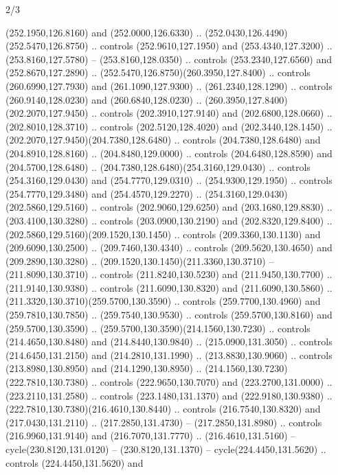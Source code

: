 \begin{flagdescription}{2/3}
\begin{scope}[xshift=0.5\flaglength,yshift=0.5\flagwidth,scale=\flagwidth/259.2]
\begin{scope}[y=0.8pt, x=0.8pt, yscale=-1,shift={(-243,-162)}]
      (252.1950,126.8160) and (252.0000,126.6330) ..
      (252.0430,126.4490)(252.5470,126.8750) .. controls (252.9610,127.1950) and
      (253.4340,127.3200) .. (253.8160,127.5780) -- (253.8160,128.0350) .. controls
      (253.2340,127.6560) and (252.8670,127.2890) ..
      (252.5470,126.8750)(260.3950,127.8400) .. controls (260.6990,127.7930) and
      (261.1090,127.9300) .. (261.2340,128.1290) .. controls (260.9140,128.0230) and
      (260.6840,128.0230) .. (260.3950,127.8400)(202.2070,127.9450) .. controls
      (202.3910,127.9140) and (202.6800,128.0660) .. (202.8010,128.3710) .. controls
      (202.5120,128.4020) and (202.3440,128.1450) ..
      (202.2070,127.9450)(204.7380,128.6480) .. controls (204.7380,128.6480) and
      (204.8910,128.8160) .. (204.8480,129.0000) .. controls (204.6480,128.8590) and
      (204.5700,128.6480) .. (204.7380,128.6480)(254.3160,129.0430) .. controls
      (254.3160,129.0430) and (254.7770,129.0310) .. (254.9300,129.1950) .. controls
      (254.7770,129.3480) and (254.4570,129.2270) ..
      (254.3160,129.0430)(202.5860,129.5160) .. controls (202.9060,129.6250) and
      (203.1680,129.8830) .. (203.4100,130.3280) .. controls (203.0900,130.2190) and
      (202.8320,129.8400) .. (202.5860,129.5160)(209.1520,130.1450) .. controls
      (209.3360,130.1130) and (209.6090,130.2500) .. (209.7460,130.4340) .. controls
      (209.5620,130.4650) and (209.2890,130.3280) ..
      (209.1520,130.1450)(211.3360,130.3710) -- (211.8090,130.3710) .. controls
      (211.8240,130.5230) and (211.9450,130.7700) .. (211.9140,130.9380) .. controls
      (211.6090,130.8320) and (211.6090,130.5860) ..
      (211.3320,130.3710)(259.5700,130.3590) .. controls (259.7700,130.4960) and
      (259.7810,130.7850) .. (259.7540,130.9530) .. controls (259.5700,130.8160) and
      (259.5700,130.3590) .. (259.5700,130.3590)(214.1560,130.7230) .. controls
      (214.4650,130.8480) and (214.8440,130.9840) .. (215.0900,131.3050) .. controls
      (214.6450,131.2150) and (214.2810,131.1990) .. (213.8830,130.9060) .. controls
      (213.8980,130.8950) and (214.1290,130.8950) ..
      (214.1560,130.7230)(222.7810,130.7380) .. controls (222.9650,130.7070) and
      (223.2700,131.0000) .. (223.2110,131.2580) .. controls (223.1480,131.1370) and
      (222.9180,130.9380) .. (222.7810,130.7380)(216.4610,130.8440) .. controls
      (216.7540,130.8320) and (217.0430,131.2110) .. (217.2850,131.4730) --
      (217.2850,131.8980) .. controls (216.9960,131.9140) and (216.7070,131.7770) ..
      (216.4610,131.5160) -- cycle(230.8120,131.0120) -- (230.8120,131.1370) --
      cycle(224.4450,131.5620) .. controls (224.4450,131.5620) and

\end{scope}
\end{scope}
\end{flagdescription}
